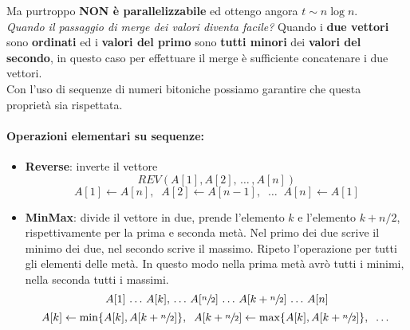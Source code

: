 Ma purtroppo \textbf{NON è parallelizzabile} ed ottengo angora $t \sim n \log n$.\\

\textit{Quando il passaggio di merge dei valori diventa facile?} Quando i \textbf{due vettori} sono \textbf{ordinati} ed i \textbf{valori del primo} sono \textbf{tutti minori} dei \textbf{valori del secondo}, in questo caso per effettuare il merge è sufficiente concatenare i due vettori.\\

Con l'uso di sequenze di numeri bitoniche possiamo garantire che questa proprietà sia rispettata.\\

\paragraph{Operazioni elementari su sequenze: }
\begin{itemize}
	\item \textbf{Reverse}: inverte il vettore
	$$ REV(A[1], A[2], \, \dots \, , A[n]) $$
	$$ A[1] \leftarrow A[n], \;\; A[2] \leftarrow A[n-1], \;\; \dots \;\; A[n] \leftarrow A[1] $$
	
	\item \textbf{MinMax}: divide il vettore in due, prende l'elemento $k$ e l'elemento $k + n/2$, rispettivamente per la prima e seconda metà. Nel primo dei due scrive il minimo dei due, nel secondo scrive il massimo. Ripeto l'operazione per tutti gli elementi delle metà. In questo modo nella prima metà avrò tutti i minimi, nella seconda tutti i massimi. 
	$$ A[1] \, \dots \, A[k], \, \dots \, A[\sfrac{n}{2}] \, \dots \, A[k + \sfrac{n}{2}] \, \dots \, A[n]$$
	$$ A[k] \leftarrow \min \{A[k], A[k + \sfrac{n}{2}]\}, \;\; A[k + \sfrac{n}{2}] \leftarrow \max \{A[k], A[k + \sfrac{n}{2}]\}, \;\; \dots $$
\end{itemize}

\newpage


